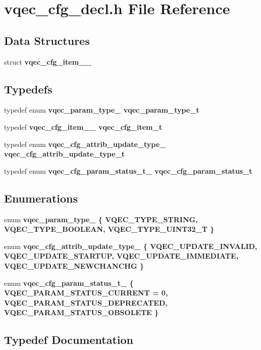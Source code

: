 \section{vqec\_\-cfg\_\-decl.h File Reference}
\label{vqec__cfg__decl_8h}
\subsection*{Data Structures}
\begin{CompactItemize}
\item 
struct \bf{vqec\_\-cfg\_\-item\_\-\_\-}
\end{CompactItemize}
\subsection*{Typedefs}
\begin{CompactItemize}
\item 
typedef enum \bf{vqec\_\-param\_\-type\_\-} \bf{vqec\_\-param\_\-type\_\-t}
\item 
typedef \bf{vqec\_\-cfg\_\-item\_\-\_\-} \bf{vqec\_\-cfg\_\-item\_\-t}
\item 
typedef enum \bf{vqec\_\-cfg\_\-attrib\_\-update\_\-type\_\-} \bf{vqec\_\-cfg\_\-attrib\_\-update\_\-type\_\-t}
\item 
typedef enum \bf{vqec\_\-cfg\_\-param\_\-status\_\-t\_\-} \bf{vqec\_\-cfg\_\-param\_\-status\_\-t}
\end{CompactItemize}
\subsection*{Enumerations}
\begin{CompactItemize}
\item 
enum \bf{vqec\_\-param\_\-type\_\-} \{ \bf{VQEC\_\-TYPE\_\-STRING}, 
\bf{VQEC\_\-TYPE\_\-BOOLEAN}, 
\bf{VQEC\_\-TYPE\_\-UINT32\_\-T}
 \}
\item 
enum \bf{vqec\_\-cfg\_\-attrib\_\-update\_\-type\_\-} \{ \bf{VQEC\_\-UPDATE\_\-INVALID}, 
\bf{VQEC\_\-UPDATE\_\-STARTUP}, 
\bf{VQEC\_\-UPDATE\_\-IMMEDIATE}, 
\bf{VQEC\_\-UPDATE\_\-NEWCHANCHG}
 \}
\item 
enum \bf{vqec\_\-cfg\_\-param\_\-status\_\-t\_\-} \{ \bf{VQEC\_\-PARAM\_\-STATUS\_\-CURRENT} =  0, 
\bf{VQEC\_\-PARAM\_\-STATUS\_\-DEPRECATED}, 
\bf{VQEC\_\-PARAM\_\-STATUS\_\-OBSOLETE}
 \}
\end{CompactItemize}


\subsection{Typedef Documentation}
